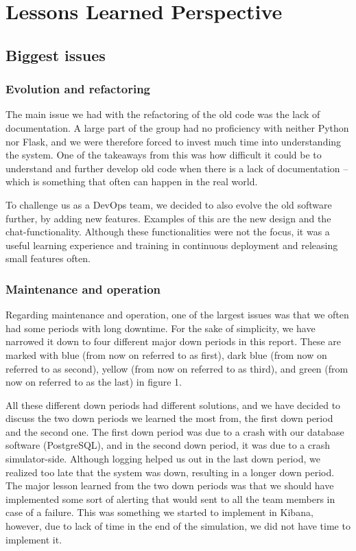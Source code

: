 \section{Lessons Learned Perspective}
\subsection{Biggest issues}
\subsubsection{Evolution and refactoring}
The main issue we had with the refactoring of the old code was the lack of documentation. A large part of the group had no proficiency with neither Python nor Flask, and we were therefore forced to invest much time into understanding the system. One of the takeaways from this was how difficult it could be to understand and further develop old code when there is a lack of documentation – which is something that often can happen in the real world.

To challenge us as a DevOps team, we decided to also evolve the old software further, by adding new features. Examples of this are the new design and the chat-functionality. Although these functionalities were not the focus, it was a useful learning experience and training in continuous deployment and releasing small features often.

\subsubsection{Maintenance and operation}

Regarding maintenance and operation, one of the largest issues was that we often had some periods with long downtime. For the sake of simplicity, we have narrowed it down to four different major down periods in this report. These are marked with blue (from now on referred to as first), dark blue (from now on referred to as second), yellow (from now on referred to as third), and green (from now on referred to as the last) in figure 1. 


 
All these different down periods had different solutions, and we have decided to discuss the two down periods we learned the most from, the first down period and the second one. The first down period was due to a crash with our database software (PostgreSQL), and in the second down period, it was due to a crash simulator-side. Although logging helped us out in the last down period, we realized too late that the system was down, resulting in a longer down period. The major lesson learned from the two down periods was that we should have implemented some sort of alerting that would sent to all the team members in case of a failure. This was something we started to implement in Kibana, however, due to lack of time in the end of the simulation, we did not have time to implement it.

